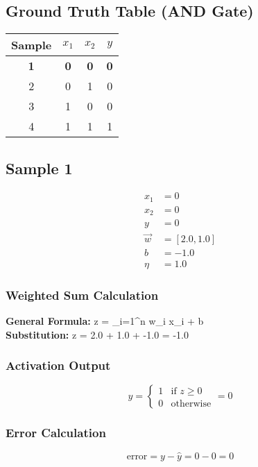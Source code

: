\documentclass{article}
\begin{document}
\subsection*{Ground Truth Table (AND Gate)}
\begin{center}
\begin{tabular}{|c|c|c|c|}
\hline
\textbf{Sample} & $x_1$ & $x_2$ & $y$ \\
\hline
\rowcolor{yellow} \textbf{1} & \textbf{0} & \textbf{0} & \textbf{0} \\
\hline
2 & 0 & 1 & 0 \\
\hline
3 & 1 & 0 & 0 \\
\hline
4 & 1 & 1 & 1 \\
\hline
\end{tabular}
\end{center}

\subsection*{Sample 1}
\begin{align*}
x_1 &= 0 \\
x_2 &= 0 \\
y &= 0 \\
\vec{w} &= [2.0, 1.0] \\
b &= -1.0 \\
\eta &= 1.0
\end{align*}

\subsubsection*{Weighted Sum Calculation}
\textbf{General Formula:} \quad
z = \sum_{i=1}^{n} w_i x_i + b
\\
\textbf{Substitution:} \quad
z = 2.0  + 1.0  + -1.0 = -1.0

\subsubsection*{Activation Output}
\[
\hat{y} =
\begin{cases}
1 & \text{if } z \geq 0 \\
0 & \text{otherwise}
\end{cases}
= 0
\]

\subsubsection*{Error Calculation}
\[
\text{error} = y - \hat{y} = 0 - 0 = 0
\]
\end{document}
